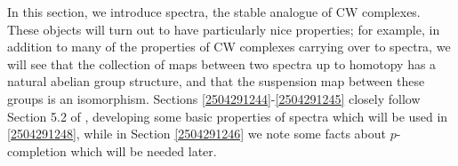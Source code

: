 \documentclass[11pt, titlepage]{article} %
\numberwithin{equation}{subsection}
\theoremstyle{plain}
\theoremstyle{definition}
\begin{document}
In this section, we introduce spectra, the stable analogue of CW complexes. These objects will turn out to have particularly nice properties; for example, in addition to many of the properties of CW complexes carrying over to spectra, we will see that the collection of maps between two spectra up to homotopy has a natural abelian group structure, and that the suspension map between these groups is an isomorphism. Sections \ref{2504291244}-\ref{2504291245} closely follow Section 5.2 of \autocite{hatcher5}, developing some basic properties of spectra which will be used in \ref{2504291248}, while in Section \ref{2504291246} we note some facts about \(p\)-completion which will be needed later. 

\begin{comment}
\subsection{?Categorical nonsense}


\end{comment}
\end{document}
